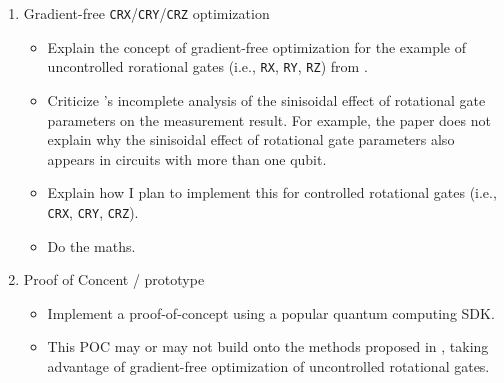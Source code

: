 \begin{enumerate}
    \item Gradient-free \texttt{CRX}/\texttt{CRY}/\texttt{CRZ} optimization
    \begin{itemize}
        \item
            Explain the concept of gradient-free optimization for the example of
            uncontrolled rorational gates (i.e., \texttt{RX}, \texttt{RY},
            \texttt{RZ}) from \cite{wendenius_gradient-free_2023}.
        \item
            Criticize \cite{wendenius_gradient-free_2023}'s incomplete
            analysis of the sinisoidal effect of rotational gate parameters on
            the measurement result.
            For example, the paper does not explain why the sinisoidal effect of
            rotational gate parameters also appears in circuits with more than
            one qubit.
        \item
            Explain how I plan to implement this for controlled rotational gates
            (i.e., \texttt{CRX}, \texttt{CRY}, \texttt{CRZ}).
        \item
            Do the maths.
    \end{itemize}

    \item Proof of Concent / prototype
    \begin{itemize}
        \item
            Implement a proof-of-concept using a popular quantum computing SDK.
        \item
            This POC may or may not build onto the methods proposed in
            \cite{wendenius_gradient-free_2023}, taking advantage of
            gradient-free optimization of uncontrolled rotational gates.
    \end{itemize}


\end{enumerate}
